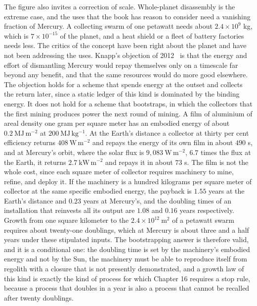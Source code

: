 The figure also invites a correction of scale. Whole-planet disassembly is the extreme case, and the uses that the book has reason to consider need a vanishing fraction of Mercury. A collecting swarm of one petawatt needs about $2.4\times10^{9}$ kg, which is $7\times10^{-15}$ of the planet, and a heat shield or a fleet of battery factories needs less. The critics of the concept have been right about the planet and have not been addressing the uses. Knapp's objection of 2012~\cite{knapp2012} is that the energy and effort of dismantling Mercury would repay themselves only on a timescale far beyond any benefit, and that the same resources would do more good elsewhere. The objection holds for a scheme that spends energy at the outset and collects the return later, since a static ledger of this kind is dominated by the binding energy. It does not hold for a scheme that bootstraps, in which the collectors that the first mining produces power the next round of mining. A film of aluminium of areal density one gram per square meter has an embodied energy of about $0.2\ \mathrm{MJ\,m^{-2}}$ at $200\ \mathrm{MJ\,kg^{-1}}$. At the Earth's distance a collector at thirty per cent efficiency returns $408\ \mathrm{W\,m^{-2}}$ and repays the energy of its own film in about $490$ s, and at Mercury's orbit, where the solar flux is $9{,}083\ \mathrm{W\,m^{-2}}$, $6.7$ times the flux at the Earth, it returns $2.7\ \mathrm{kW\,m^{-2}}$ and repays it in about $73$ s. The film is not the whole cost, since each square meter of collector requires machinery to mine, refine, and deploy it. If the machinery is a hundred kilograms per square meter of collector at the same specific embodied energy, the payback is $1.55$ years at the Earth's distance and $0.23$ years at Mercury's, and the doubling times of an installation that reinvests all its output are $1.08$ and $0.16$ years respectively. Growth from one square kilometer to the $2.4\times10^{12}\ \mathrm{m^2}$ of a petawatt swarm requires about twenty-one doublings, which at Mercury is about three and a half years under these stipulated inputs. The bootstrapping answer is therefore valid, and it is a conditional one: the doubling time is set by the machinery's embodied energy and not by the Sun, the machinery must be able to reproduce itself from regolith with a closure that is not presently demonstrated, and a growth law of this kind is exactly the kind of process for which Chapter 16 requires a stop rule, because a process that doubles in a year is also a process that cannot be recalled after twenty doublings.

